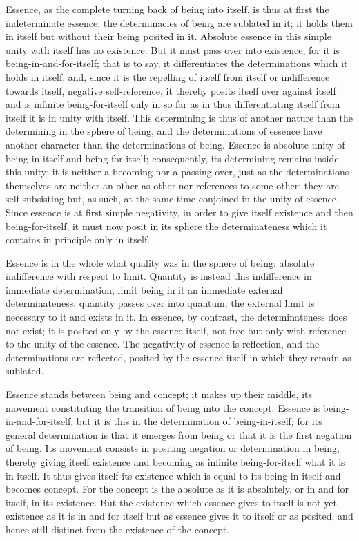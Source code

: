 Essence, as the complete turning back of being into itself,
is thus at first the indeterminate essence;
the determinacies of being are sublated in it;
it holds them in itself but without their being posited in it.
Absolute essence in this simple unity with itself has no existence.
But it must pass over into existence,
for it is being-in-and-for-itself;
that is to say, it differentiates
the determinations which it holds in itself,
and, since it is the repelling of itself from itself
or indifference towards itself, negative self-reference,
it thereby posits itself over against itself
and is infinite being-for-itself
only in so far as in thus
differentiating itself from itself
it is in unity with itself.
This determining is thus of another nature than
the determining in the sphere of being,
and the determinations of essence have another character
than the determinations of being.
Essence is absolute unity of being-in-itself and being-for-itself;
consequently, its determining remains inside this unity;
it is neither a becoming nor a passing over,
just as the determinations themselves are
neither an other as other nor references to some other;
they are self-subsisting but, as such,
at the same time conjoined in the unity of essence.
Since essence is at first simple negativity,
in order to give itself existence and then being-for-itself,
it must now posit in its sphere the determinateness
which it contains in principle only in itself.

Essence is in the whole what quality was in the sphere of being:
absolute indifference with respect to limit.
Quantity is instead this indifference in immediate determination,
limit being in it an immediate external determinateness;
quantity passes over into quantum;
the external limit is necessary to it and exists in it.
In essence, by contrast, the determinateness does not exist;
it is posited only by the essence itself,
not free but only with reference to
the unity of the essence.
The negativity of essence is reflection,
and the determinations are reflected,
posited by the essence itself
in which they remain as sublated.

Essence stands between being and concept;
it makes up their middle,
its movement constituting the transition
of being into the concept.
Essence is being-in-and-for-itself,
but it is this in the determination of being-in-itself;
for its general determination is that it emerges from being
or that it is the first negation of being.
Its movement consists in positing negation
or determination in being,
thereby giving itself existence
and becoming as infinite being-for-itself
what it is in itself.
It thus gives itself its existence
which is equal to its being-in-itself
and becomes concept.
For the concept is the absolute
as it is absolutely,
or in and for itself,
in its existence.
But the existence which essence gives to itself is
not yet existence as it is in and for itself
but as essence gives it to itself or as posited,
and hence still distinct from the existence of the concept.

